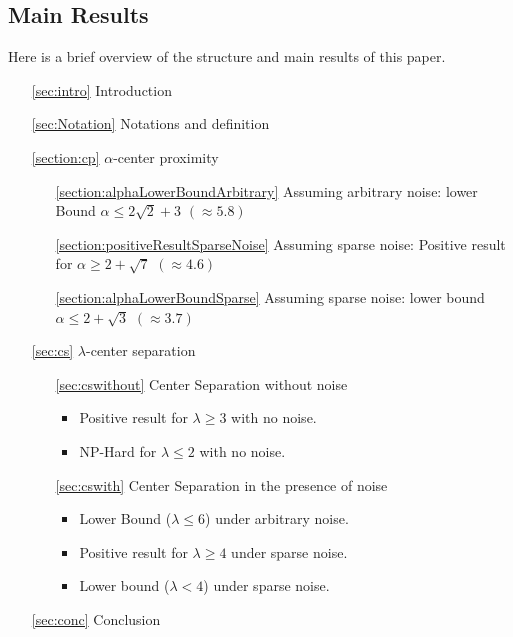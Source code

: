 \documentclass[anon,12pt]{colt2016} %
\begin{document}
\subsection{Main Results}
Here is a brief overview of the structure and main results of this paper.
\vspace{-0.1in}\begin{enumerate}
\setlength\itemsep{0em}
\item[\ref{sec:intro}] Introduction
\item[\ref{sec:Notation}] Notations and definition
\item[\ref{section:cp}] $\alpha$-center proximity	\vspace{-0.1in}
	\begin{enumerate}[leftmargin=32pt]
	\renewcommand{\labelenumii}{\theenumii}
	\renewcommand{\theenumii}{\theenumi.\arabic{enumii}.}
	\setlength\itemsep{0em}
	\item[\ref{section:alphaLowerBoundArbitrary}] Assuming arbitrary noise: lower Bound $\alpha \le 2\sqrt{2} + 3$ $(\approx 5.8)$
	\item[\ref{section:positiveResultSparseNoise}] Assuming sparse noise: Positive result for $\alpha \ge 2+\sqrt{7}$ $(\approx 4.6)$
	\item[\ref{section:alphaLowerBoundSparse}] Assuming sparse noise: lower bound $\alpha \le 2+\sqrt{3}$ $(\approx 3.7)$
	\end{enumerate}
\item[\ref{sec:cs}] $\lambda$-center separation \vspace{-0.1in}
	\begin{enumerate}[leftmargin=32pt]
	\renewcommand{\labelenumii}{\theenumii}
	\renewcommand{\theenumii}{\theenumi.\arabic{enumii}.}
	\setlength\itemsep{0em}
	\item[\ref{sec:cswithout}] Center Separation without noise
	\begin{itemize}
	\item Positive result for $\lambda \ge 3$ with no noise.
	\item NP-Hard for $\lambda \le 2$ with no noise.
	\end{itemize}
	\item[\ref{sec:cswith}] Center Separation in the presence of noise \begin{itemize}
	\item Lower Bound ($\lambda \le 6$) under arbitrary noise.
	\item Positive result for $\lambda \ge 4$ under sparse noise.
	\item Lower bound ($\lambda < 4$) under sparse noise.
	\end{itemize}
	\end{enumerate}
\item[\ref{sec:conc}] Conclusion
\end{enumerate}
\end{document}
